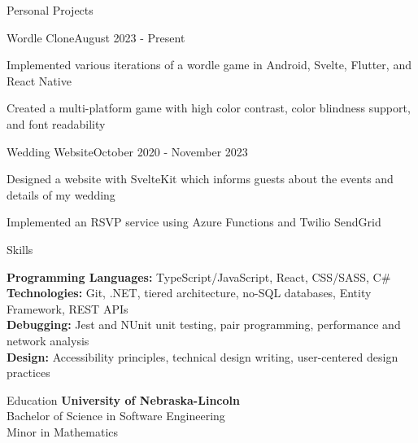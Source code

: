 \documentclass[
	11pt, %
]{article} %
\begin{document}
\begin{rSection}{Personal Projects}

	\begin{rSubsection}{Wordle Clone}{August 2023 - Present}{}{}
		\item Implemented various iterations of a wordle game in Android, Svelte, Flutter, and React Native
		\item Created a multi-platform game with high color contrast, color blindness support, and font readability
	\end{rSubsection}

	\begin{rSubsection}{Wedding Website}{October 2020 - November 2023}{}{}
		\item Designed a website with SvelteKit which informs guests about the events and details of my wedding
		\item Implemented an RSVP service using Azure Functions and Twilio SendGrid
	\end{rSubsection}

\end{rSection}

\begin{rSection}{Skills}

	\textbf{Programming Languages:} TypeScript/JavaScript, React, CSS/SASS, C\# \\
	\textbf{Technologies:} Git, .NET, tiered architecture, no-SQL databases, Entity Framework, REST APIs \\
	\textbf{Debugging:} Jest and NUnit unit testing, pair programming, performance and network analysis \\
	\textbf{Design:} Accessibility principles, technical design writing, user-centered design practices

\end{rSection}

\begin{rSection}{Education}
	\textbf{University of Nebraska-Lincoln} \\
	Bachelor of Science in Software Engineering \\
	Minor in Mathematics
\end{rSection}





\end{document}
